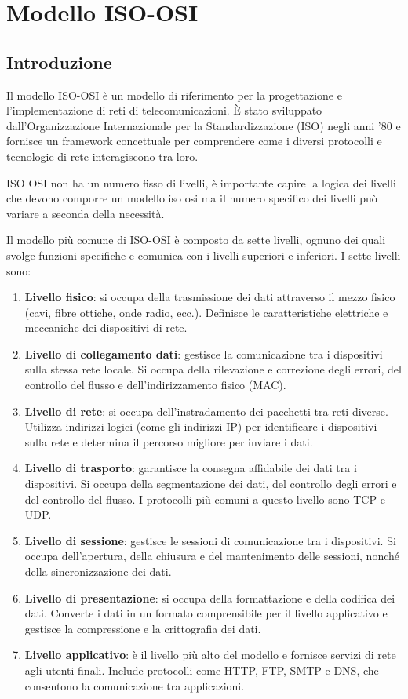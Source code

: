 \section{Modello ISO-OSI}
\subsection{Introduzione}
Il modello ISO-OSI è un modello di riferimento per la progettazione e l'implementazione di reti di telecomunicazioni. È stato sviluppato dall'Organizzazione Internazionale per la Standardizzazione (ISO) negli anni '80 e fornisce un framework concettuale per comprendere come i diversi protocolli e tecnologie di rete interagiscono tra loro.

ISO OSI non ha un numero fisso di livelli, è importante capire la logica dei livelli che devono comporre un modello iso osi ma il numero specifico dei livelli può variare a seconda della necessità.

Il modello più comune di ISO-OSI è composto da sette livelli, ognuno dei quali svolge funzioni specifiche e comunica con i livelli superiori e inferiori. I sette livelli sono:
\begin{enumerate}
    \item \textbf{Livello fisico}: si occupa della trasmissione dei dati attraverso il mezzo fisico (cavi, fibre ottiche, onde radio, ecc.). Definisce le caratteristiche elettriche e meccaniche dei dispositivi di rete.
    \item \textbf{Livello di collegamento dati}: gestisce la comunicazione tra i dispositivi sulla stessa rete locale. Si occupa della rilevazione e correzione degli errori, del controllo del flusso e dell'indirizzamento fisico (MAC).
    \item \textbf{Livello di rete}: si occupa dell'instradamento dei pacchetti tra reti diverse. Utilizza indirizzi logici (come gli indirizzi IP) per identificare i dispositivi sulla rete e determina il percorso migliore per inviare i dati.
    \item \textbf{Livello di trasporto}: garantisce la consegna affidabile dei dati tra i dispositivi. Si occupa della segmentazione dei dati, del controllo degli errori e del controllo del flusso. I protocolli più comuni a questo livello sono TCP e UDP.
    \item \textbf{Livello di sessione}: gestisce le sessioni di comunicazione tra i dispositivi. Si occupa dell'apertura, della chiusura e del mantenimento delle sessioni, nonché della sincronizzazione dei dati.
    \item \textbf{Livello di presentazione}: si occupa della formattazione e della codifica dei dati. Converte i dati in un formato comprensibile per il livello applicativo e gestisce la compressione e la crittografia dei dati.
    \item \textbf{Livello applicativo}: è il livello più alto del modello e fornisce servizi di rete agli utenti finali. Include protocolli come HTTP, FTP, SMTP e DNS, che consentono la comunicazione tra applicazioni.
\end{enumerate}

